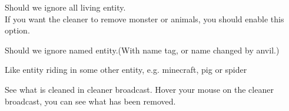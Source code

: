 Should we ignore all living entity.\\
If you want the cleaner to remove monster or animals, you should enable this option.

Should we ignore named entity.(With name tag, or name changed by anvil.)


Like entity riding in some other entity, e.g. minecraft, pig or spider





\begin{tips}{See what is cleaned in cleaner broadcast.}
    Hover your mouse on the cleaner broadcast, you can see what has been removed.
\end{tips}




